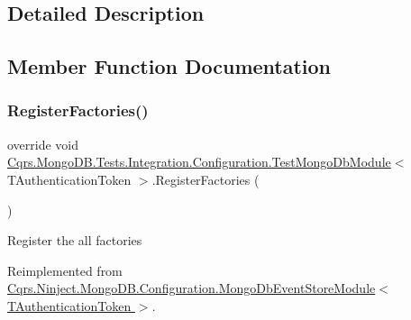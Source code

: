 \subsection{Detailed Description}


\subsection{Member Function Documentation}
\mbox{\label{classCqrs_1_1MongoDB_1_1Tests_1_1Integration_1_1Configuration_1_1TestMongoDbModule_aa8a3a1f8c74becc8bb36008abe2c6e0f_aa8a3a1f8c74becc8bb36008abe2c6e0f}} 
\subsubsection{\texorpdfstring{Register\+Factories()}{RegisterFactories()}}
{\footnotesize\ttfamily override void \hyperlink{classCqrs_1_1MongoDB_1_1Tests_1_1Integration_1_1Configuration_1_1TestMongoDbModule}{Cqrs.\+Mongo\+D\+B.\+Tests.\+Integration.\+Configuration.\+Test\+Mongo\+Db\+Module}$<$ T\+Authentication\+Token $>$.Register\+Factories (\begin{DoxyParamCaption}{ }\end{DoxyParamCaption})\hspace{0.3cm}{\ttfamily [virtual]}}



Register the all factories 



Reimplemented from \hyperlink{classCqrs_1_1Ninject_1_1MongoDB_1_1Configuration_1_1MongoDbEventStoreModule_a32cbf7060777484eb68c4dc032109e6c_a32cbf7060777484eb68c4dc032109e6c}{Cqrs.\+Ninject.\+Mongo\+D\+B.\+Configuration.\+Mongo\+Db\+Event\+Store\+Module$<$ T\+Authentication\+Token $>$}.

